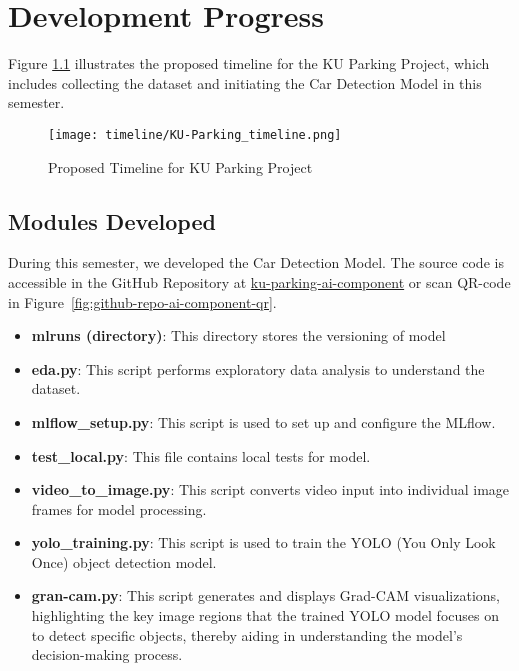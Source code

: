 \chapter{Development Progress}
\label{chap:developmentprogress}
Figure \ref{fig:timeline-dev-progress} illustrates the proposed timeline for the KU Parking Project, which includes collecting the dataset and initiating the Car Detection Model in this semester.

\begin{figure}[H]
    \centering
    \texttt{[image: timeline/KU-Parking\_timeline.png]}
    \caption{Proposed Timeline for KU Parking Project}
    \label{fig:timeline-dev-progress}
\end{figure}

\section{Modules Developed}
\label{section:module-developed}
During this semester, we developed the Car Detection Model. The source code is accessible in the GitHub Repository at \href{https://github.com/ReggieReo/ku-parking-ai-component/blob/main/gran-cam.py}{ku-parking-ai-component} or scan QR-code in Figure~\ref{fig:github-repo-ai-component-qr}.
\begin{itemize}
    \item \textbf{mlruns (directory)}: This directory stores the versioning of model
    \item \textbf{eda.py}: This script performs exploratory data analysis to understand the dataset.
    \item \textbf{mlflow\_setup.py}: This script is used to set up and configure the MLflow.
    \item \textbf{test\_local.py}: This file contains local tests for model.
    \item \textbf{video\_to\_image.py}: This script converts video input into individual image frames for model processing.
    \item \textbf{yolo\_training.py}: This script is used to train the YOLO (You Only Look Once) object detection model.
    \item \textbf{gran-cam.py}: This script generates and displays Grad-CAM visualizations, highlighting the key image regions that the trained YOLO model focuses on to detect specific objects, thereby aiding in understanding the model's decision-making process.
\end{itemize}

